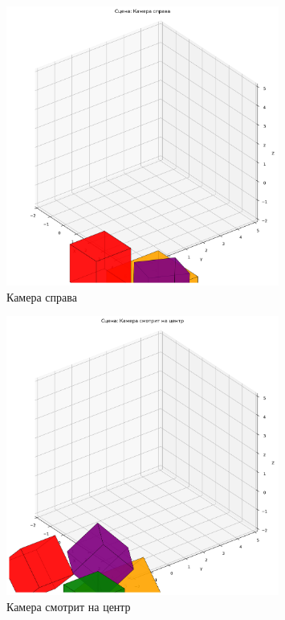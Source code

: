 \begin{figure}[H]
\centering
\includegraphics[width=0.8\textwidth]{images/task6/camera_right.png}
\caption{Камера справа}
\end{figure}

\begin{figure}[H]
\centering
\includegraphics[width=0.8\textwidth]{images/task6/camera_look_at_center.png}
\caption{Камера смотрит на центр}
\end{figure}

